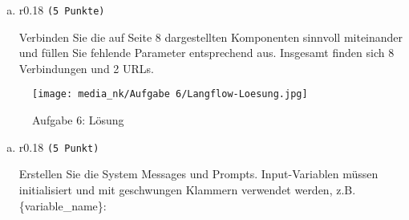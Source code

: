 \documentclass[12pt, ngerman]{AssignmentClass}
\begin{document}
    \begin{enumerate}[a)]
		\item 
			\begin{minipage}[t]{\linewidth}
				\vspace{-0.61em}
				\begin{wrapfigure}[2]{r}{0.18\linewidth} 
					\raggedleft
					\texttt{(5 Punkte)}
				\end{wrapfigure}
                Verbinden Sie die auf Seite 8 dargestellten Komponenten sinnvoll miteinander und füllen Sie fehlende Parameter entsprechend aus. Insgesamt finden sich 8 Verbindungen und 2 URLs.
        	\end{minipage}
	\end{enumerate}

    \newpage


	\begin{solution}
		\noindent
            \begin{figure}[h!]
                \centering
                \texttt{[image: media\_nk/Aufgabe 6/Langflow-Loesung.jpg]}
                \caption{Aufgabe 6: Lösung}
                \label{fig:Aufgabe-6-Lösung}
            \end{figure}
	\end{solution}

    \newpage

    \begin{enumerate}[b)]
		\item 
			\begin{minipage}[t]{\linewidth}
				\vspace{-0.61em}
				\begin{wrapfigure}[2]{r}{0.18\linewidth} 
					\raggedleft
					\texttt{(5 Punkt)}
				\end{wrapfigure}
                Erstellen Sie die System Messages und Prompts. Input-Variablen müssen initialisiert und mit geschwungen Klammern verwendet werden, z.B. \{variable\_name\}:
			\end{minipage}
	\end{enumerate}

    \vspace{1cm}
\end{document}
